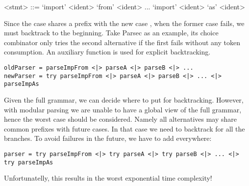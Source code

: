 \setlength{\grammarindent}{5em}
\begin{grammar}
<stmt> ::= `import' <ident> `from' <ident>
    \alt ...
    \alt `import' <ident> `as' <ident>
\end{grammar}

Since the  case shares a prefix with the new case , when the former case fails, we must backtrack to the beginning. Take Parsec as an example, its choice
combinator \inlinecode{<|>} only tries the second alternative if the first fails
without any token consumption. An auxiliary function  is used for explicit backtracking.

\begin{lstlisting}[language=PlainCode]
oldParser = parseImpFrom <|> parseA <|> parseB <|> ...
newParser = try parseImpFrom <|> parseA <|> parseB <|> ... <|> parseImpAs
\end{lstlisting}

Given the full grammar, we can decide where to put  for backtracking. However, with modular parsing we are unable to have a global view of the full grammar, hence the worst case should be considered. Namely all alternatives may share common prefixes with future cases. In that case we need to backtrack for all the branches. To avoid failures in the future, we have to add  everywhere:

\begin{lstlisting}[language=PlainCode]
parser = try parseImpFrom <|> try parseA <|> try parseB <|> ... <|> try parseImpAs
\end{lstlisting}

\noindent Unfortunatelly, this results in the worst exponential time complexity!

